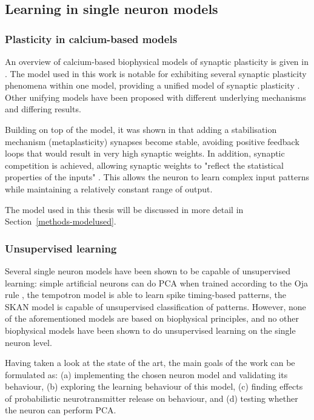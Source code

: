 \documentclass[a4paper,12pt]{report}
\theoremstyle{definition}
\begin{document}
\subsection{Learning in single neuron models}

\subsubsection{Plasticity in calcium-based models} %
\label{subsec:cabasedmodels}
An overview of calcium-based biophysical models of synaptic plasticity is given in \cite{shouval2007models}. The model used in this work is notable for exhibiting several synaptic plasticity phenomena within one model, providing a unified model of synaptic plasticity \cite{shouval2002unified}. Other unifying models have been proposed with different underlying mechanisms and differing results.

Building on top of the \cite{shouval2002unified} model, it was shown in \cite{yeung2004synaptic} that adding a stabilisation mechanism (metaplasticity) synapses become stable, avoiding positive feedback loops that would result in very high synaptic weights. In addition, synaptic competition is achieved, allowing synaptic weights to "reflect the statistical properties of the inputs" \cite{yeung2004synaptic}. This allows the neuron to learn complex input patterns while maintaining a relatively constant range of output.

The model used in this thesis will be discussed in more detail in Section~\ref{methods-modelused}.

\subsubsection{Unsupervised learning}

Several single neuron models have been shown to be capable of unsupervised learning: simple artificial neurons can do PCA when trained according to the Oja rule \cite{oja2008oja}, the tempotron model \cite{gutig2006tempotron} is able to learn spike timing-based patterns, the SKAN model \cite{afshar2014racing} is capable of unsupervised classification of patterns. However, none of the aforementioned models are based on biophysical principles, and no other biophysical models have been shown to do unsupervised learning on the single neuron level.



Having taken a look at the state of the art, the main goals of the work can be formulated as:
(a) implementing the chosen neuron model and validating its behaviour,
(b) exploring the learning behaviour of this model,
(c) finding effects of probabilistic neurotransmitter release on behaviour, and
(d) testing whether the neuron can perform PCA.
\end{document}
